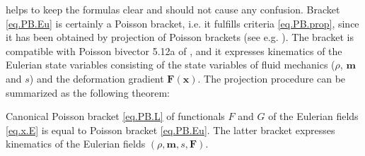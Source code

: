 \documentclass[
10pt, %
a4paper, %
oneside, %
headinclude,footinclude, %
BCOR5mm, %
]{scrartcl}
\newcommand{\xx}{\mathbf{x}}
\newcommand{\mm}{\mathbf{m}}
\newcommand{\FF}{\mathbf{F}}
\newcommand{\IP}[1]{{\color{Red}IP:\ \ #1}}
\newcommand{\VK}[1]{{\color{Cyan}VK:\ \ #1}}
\newcommand{\Ffunc}{F}
\newcommand{\Gfunc}{G}
\begin{document}
helps 
to keep the formulas clear and should not cause any confusion.
Bracket \eqref{eq.PB.Eu} is certainly a Poisson bracket, i.e. it fulfills criteria \eqref{eq.PB.prop}, since it has been obtained by projection of Poisson brackets (see e.g. \cite{PhysD-hierarchy}). The bracket is compatible with Poisson bivector 5.12a of \cite{Markus2009}, and it expresses kinematics of the Eulerian state variables consisting of the state variables of fluid mechanics ($\rho$, $\mm$ and $s$) and the deformation gradient $\FF(\xx)$. The projection procedure can be summarized as the following theorem:
\begin{theorem}
Canonical Poisson bracket \eqref{eq.PB.L} of functionals $\Ffunc$ and $\Gfunc$ 
of the Eulerian fields \eqref{eq.x.E}  is equal 
to Poisson bracket \eqref{eq.PB.Eu}.
The latter bracket expresses kinematics of the Eulerian fields $(\rho,\mm,s,\FF)$.
\end{theorem}
\end{document}

